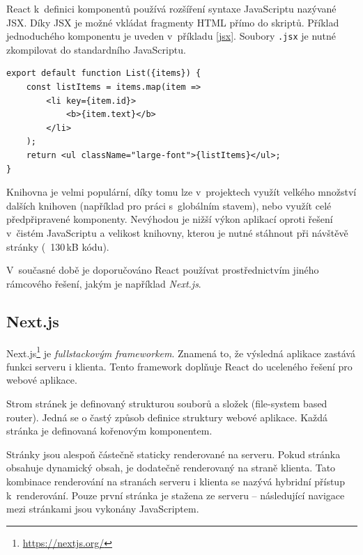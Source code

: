 React k~definici komponentů používá rozšíření syntaxe JavaScriptu nazývané JSX.
Díky JSX je možné vkládat fragmenty HTML přímo do skriptů.
Příklad jednoduchého komponentu je uveden v~příkladu \ref{jsx}.
Soubory \texttt{.jsx} je nutné zkompilovat do standardního JavaScriptu. 

\begin{lstlisting}[caption={Příklad komponentu definovaného v~\texttt{.jsx} souboru. Komponent renderuje array předanou v~parametrech jako list v~HTML. Komponent definuje jak logiku, tak i vzhled. S~fragmenty HTML je možné pracovat jako s~hodnotami.},captionpos=b,label=jsx]
export default function List({items}) {
    const listItems = items.map(item =>
        <li key={item.id}>
            <b>{item.text}</b>
        </li>
    );
    return <ul className="large-font">{listItems}</ul>;
}
\end{lstlisting}

Knihovna je velmi populární, díky tomu lze v~projektech využít velkého množství dalších knihoven (například pro práci s~globálním stavem), nebo využít celé předpřipravené komponenty.
Nevýhodou je nižší výkon aplikací oproti řešení v~čistém JavaScriptu a velikost knihovny, kterou je nutné stáhnout při návštěvě stránky (~130\,kB kódu).

V~současné době je doporučováno React používat prostřednictvím jiného rámcového řešení, jakým je například \emph{Next.js}.

\subsection{Next.js}

Next.js\footnote{\url{https://nextjs.org/}} je \emph{fullstackovým frameworkem}.
Znamená to, že výsledná aplikace zastává funkci serveru i klienta.
Tento framework doplňuje React do uceleného řešení pro webové aplikace.

Strom stránek je definovaný strukturou souborů a složek (file-system based router).
Jedná se o častý způsob definice struktury webové aplikace.
Každá stránka je definovaná kořenovým komponentem.

Stránky jsou alespoň částečně staticky renderované na serveru.
Pokud stránka obsahuje dynamický obsah, je dodatečně renderovaný na straně klienta.
Tato kombinace renderování na stranách serveru i klienta se nazývá hybridní přístup k~renderování.
Pouze první stránka je stažena ze serveru -- následující navigace mezi stránkami jsou vykonány JavaScriptem.

